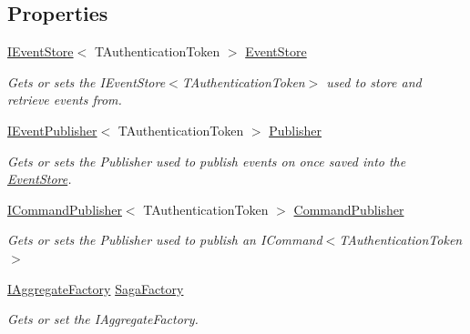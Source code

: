 \subsection*{Properties}
\begin{DoxyCompactItemize}
\item 
\hyperlink{interfaceCqrs_1_1Events_1_1IEventStore}{I\+Event\+Store}$<$ T\+Authentication\+Token $>$ \hyperlink{classCqrs_1_1Domain_1_1SagaRepository_a4b872f1a20660ece8ce1b54720193fda_a4b872f1a20660ece8ce1b54720193fda}{Event\+Store}
\begin{DoxyCompactList}\small\item\em Gets or sets the I\+Event\+Store$<$\+T\+Authentication\+Token$>$ used to store and retrieve events from. \end{DoxyCompactList}\item 
\hyperlink{interfaceCqrs_1_1Events_1_1IEventPublisher}{I\+Event\+Publisher}$<$ T\+Authentication\+Token $>$ \hyperlink{classCqrs_1_1Domain_1_1SagaRepository_a94707dc4549d096ea3cf5d241117495a_a94707dc4549d096ea3cf5d241117495a}{Publisher}
\begin{DoxyCompactList}\small\item\em Gets or sets the Publisher used to publish events on once saved into the \hyperlink{namespaceCqrs_1_1EventStore}{Event\+Store}. \end{DoxyCompactList}\item 
\hyperlink{interfaceCqrs_1_1Commands_1_1ICommandPublisher}{I\+Command\+Publisher}$<$ T\+Authentication\+Token $>$ \hyperlink{classCqrs_1_1Domain_1_1SagaRepository_a65911c8ed6a372f3cccb4c175f198abb_a65911c8ed6a372f3cccb4c175f198abb}{Command\+Publisher}
\begin{DoxyCompactList}\small\item\em Gets or sets the Publisher used to publish an I\+Command$<$\+T\+Authentication\+Token$>$ \end{DoxyCompactList}\item 
\hyperlink{interfaceCqrs_1_1Domain_1_1Factories_1_1IAggregateFactory}{I\+Aggregate\+Factory} \hyperlink{classCqrs_1_1Domain_1_1SagaRepository_a578164fa38728f3a23ca41d8c81611e0_a578164fa38728f3a23ca41d8c81611e0}{Saga\+Factory}
\begin{DoxyCompactList}\small\item\em Gets or set the I\+Aggregate\+Factory. \end{DoxyCompactList}\item 

\end{DoxyCompactItemize}
